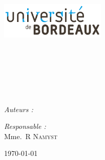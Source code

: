 
\begin{titlepage}

\begin{center}

\begin{minipage}[t]{0.48\textwidth}
  \begin{flushleft}
    \includegraphics [width=50mm]{images/index.png} \\[0.5cm]

  \end{flushleft}
\end{minipage}
\begin{minipage}[t]{0.48\textwidth}
  \begin{flushright}
  \end{flushright}
\end{minipage} \\[1.5cm]

\textsc{\Large \reportsubject}\\[0.5cm]
\HRule \\[0.4cm]
{\huge \bfseries \reporttitle}\\[0.4cm]
\HRule \\[1.5cm]

\begin{minipage}[t]{0.6\textwidth}
  \begin{flushleft} \large
    \emph{Auteurs :}\\ 
    \reportauthor
  \end{flushleft}
\end{minipage}

\hfill






\begin{minipage}[t]{0.6\textwidth}
  \begin{flushright} \large
    \emph{Responsable :} \\
    Mme.~R \textsc{Namyst}\\
  \end{flushright}
\end{minipage}

\vfill

{\large \today}

\end{center}

\end{titlepage}
